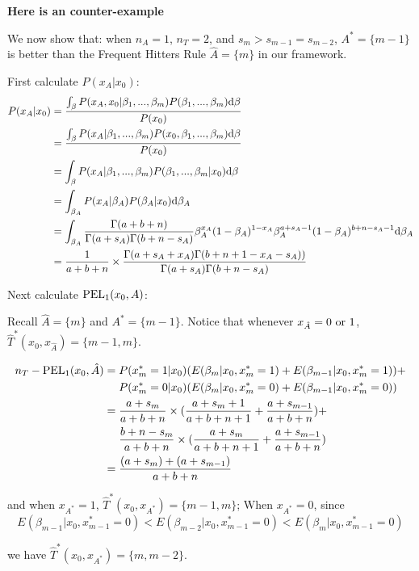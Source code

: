 \documentclass[12pt]{article}
\begin{document}
\textbf{Here is an counter-example}

We now show that: when $n_A = 1$, $n_T = 2$, and $s_m > s_{m-1} = s_{m-2}$, $A^* = \{m-1\}$ is better than the Frequent Hitters Rule $\hat{A} = \{m\}$ in our framework.

First calculate $P(x_A|x_0)$:
\begin{align*}
    P(x_A|x_0) &= \frac{\int_\beta P(x_A, x_0|\beta_1,...,\beta_m)P(\beta_1,...,\beta_m){\rm d}\beta}{P(x_0)}\\
    &= \frac{\int_\beta P(x_A|\beta_1,...,\beta_m)P(x_0,\beta_1,...,\beta_m){\rm d}\beta}{P(x_0)}\\
    &= \int_\beta P(x_A|\beta_1,...,\beta_m)P(\beta_1,...,\beta_m|x_0){\rm d}\beta\\
    &= \int_{\beta_A} P(x_A|\beta_A)P(\beta_A|x_0){\rm d}\beta_A\\
    &= \int_{\beta_A} \frac{\Gamma(a+b+n)}{\Gamma(a+s_A)\Gamma(b+n-s_A)}\beta_A^{x_A}(1 - \beta_A)^{1-x_A}\beta_A^{a+s_A - 1}(1-\beta_A)^{b+n-s_A-1}{\rm d}\beta_A\\
    &= \frac{1}{a+b+n}\times\frac{\Gamma(a+s_A+x_A)\Gamma(b+n+1-x_A-s_A))}{\Gamma(a+s_A)\Gamma(b+n-s_A)}
\end{align*}

Next calculate ${\rm PEL}_1(x_0,A)$:

Recall $\hat{A} = \{m\}$ and $A^* = \{m-1\}$. Notice that whenever $x_{\hat{A}} = 0~ {\rm or} ~1$, $\hat{T}^*(x_0,x_{\hat{A}}) = \{m-1,m\}$. 

\begin{align*}
    n_T - {\rm PEL}_1(x_0, \hat{A}) &= P(x_m^* = 1|x_0)(E(\beta_m|x_0,x_m^* = 1) + E(\beta_{m-1}|x_0, x_m^* = 1)) +\\ &~~~~P(x_m^* = 0|x_0)(E(\beta_m|x_0,x_m^* = 0) + E(\beta_{m-1}|x_0, x_m^* = 0))\\
    &= \frac{a+s_m}{a+b+n}\times (\frac{a+s_m+1}{a+b+n+1} + \frac{a+s_{m-1}}{a+b+n})+\\ &~~~~\frac{b+n-s_m}{a+b+n}\times(\frac{a+s_m}{a+b+n+1} + \frac{a+s_{m-1}}{a+b+n})\\
    &= \frac{(a + s_m) + (a+s_{m-1})}{a+b+n}
\end{align*}

and when $x_{A^*} = 1$, $\hat{T}^*(x_0,x_{A^*}) = \{m-1,m\}$; When $x_{A^*} = 0$, since $$
E(\beta_{m-1}|x_0,x_{m-1}^* = 0) < E(\beta_{m-2}|x_0,x_{m-1}^* = 0)<E(\beta_m|x_0,x_{m-1}^* = 0)
$$ 

we have $\hat{T}^*(x_0,x_{A^*}) = \{m,m-2\}$.
\end{document}
